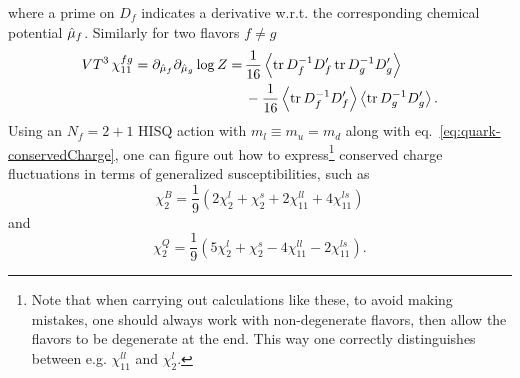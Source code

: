 where a prime on $D_f$ indicates a derivative w.r.t. the corresponding chemical
potential $\hat{\mu}_f$. Similarly for two flavors $f\neq g$ 
\begin{equation}\begin{aligned}
  VT^3\,\chi_{11}^{fg} =\partial_{\muh_f}\partial_{\muh_g}\log Z
                 = \,& \frac{1}{16}\ev{\tr D_f^{-1}D_f'\tr D_g^{-1}D_g'} \\
                   & -\frac{1}{16}\ev{\tr D_f^{-1}D_f'}\ev{\tr D_g^{-1}D_g'}.
\end{aligned}\end{equation}
Using an $N_f=2+1$ HISQ action with $m_l\equiv m_u=m_d$ along with 
eq.~\eqref{eq:quark-conservedCharge}, one can figure out how to 
express\footnote{Note that when carrying out calculations like these, to avoid making mistakes,
one should always work with non-degenerate flavors, then allow the flavors to be
degenerate at the end. This way one correctly distinguishes between e.g.
$\chi_{11}^{ll}$ and $\chi_2^l$.} conserved charge fluctuations in terms of 
generalized susceptibilities, such as
\begin{equation}
  \chi_2^B=\frac{1}{9}\left(2\chi_2^l+\chi_2^s+2\chi_{11}^{ll}+4\chi_{11}^{ls}\right)
\end{equation}
and
\begin{equation}
  \chi_2^Q=\frac{1}{9}\left(5\chi_2^l+\chi_2^s-4\chi_{11}^{ll}-2\chi_{11}^{ls}\right).
\end{equation}





